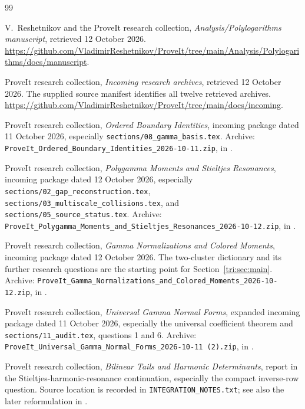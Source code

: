 \documentclass[11pt,a4paper]{article}
\theoremstyle{definition}
\theoremstyle{remark}
\numberwithin{equation}{section}
\newcommand{\file}[1]{\nolinkurl{#1}}
\begin{document}
\begin{thebibliography}{99}
\small
\setlength{\itemsep}{3pt}
\setlength{\parsep}{0pt}
\setlength{\parskip}{0pt}

V.~Reshetnikov and the ProveIt research collection,
\emph{Analysis/Polylogarithms manuscript}, retrieved 12 October 2026.
\url{https://github.com/VladimirReshetnikov/ProveIt/tree/main/Analysis/Polylogarithms/docs/manuscript}.

ProveIt research collection, \emph{Incoming research archives},
retrieved 12 October 2026. The supplied source manifest identifies
all twelve retrieved archives.
\url{https://github.com/VladimirReshetnikov/ProveIt/tree/main/docs/incoming}.

ProveIt research collection,
\emph{Ordered Boundary Identities}, incoming package dated
11 October 2026, especially
\file{sections/08_gamma_basis.tex}.
Archive: \file{ProveIt_Ordered_Boundary_Identities_2026-10-11.zip},
in \cite{RepoIncoming}.

ProveIt research collection,
\emph{Polygamma Moments and Stieltjes Resonances}, incoming package
dated 12 October 2026, especially
\file{sections/02_gap_reconstruction.tex},
\file{sections/03_multiscale_collisions.tex}, and
\file{sections/05_source_status.tex}.
Archive: \file{ProveIt_Polygamma_Moments_and_Stieltjes_Resonances_2026-10-12.zip},
in \cite{RepoIncoming}.

ProveIt research collection,
\emph{Gamma Normalizations and Colored Moments}, incoming package
dated 12 October 2026. The two-cluster dictionary and its further
research questions are the starting point for
Section~\ref{tri:sec:main}.
Archive: \file{ProveIt_Gamma_Normalizations_and_Colored_Moments_2026-10-12.zip},
in \cite{RepoIncoming}.

ProveIt research collection,
\emph{Universal Gamma Normal Forms}, expanded incoming package dated
11 October 2026, especially the universal coefficient theorem and
\file{sections/11_audit.tex}, questions 1 and 6.
Archive: \file{ProveIt_Universal_Gamma_Normal_Forms_2026-10-11 (2).zip},
in \cite{RepoIncoming}.

ProveIt research collection,
\emph{Bilinear Tails and Harmonic Determinants}, report in the
Stieltjes-harmonic-resonance continuation, especially the compact
inverse-row question. Source location is recorded in
\file{INTEGRATION_NOTES.txt}; see also the later reformulation in
\cite{PolygammaResonances}.


\end{thebibliography}
\end{document}
